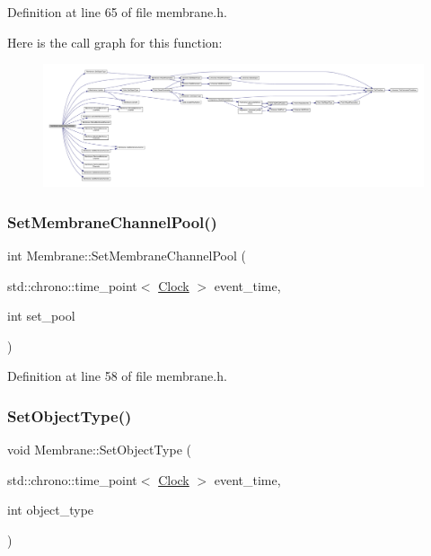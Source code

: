 Definition at line 65 of file membrane.\+h.

Here is the call graph for this function\+:
\nopagebreak
\begin{figure}[H]
\begin{center}
\leavevmode
\includegraphics[width=350pt]{class_membrane_a6d0b96fb6d823cc113dd56b8889b1544_cgraph}
\end{center}
\end{figure}
\mbox{\label{class_membrane_a2cb70232c6aecf1c83a8e0918cb7fabe}} 
\subsubsection{\texorpdfstring{Set\+Membrane\+Channel\+Pool()}{SetMembraneChannelPool()}}
{\footnotesize\ttfamily int Membrane\+::\+Set\+Membrane\+Channel\+Pool (\begin{DoxyParamCaption}\item[{std\+::chrono\+::time\+\_\+point$<$ \hyperlink{universe_8h_a0ef8d951d1ca5ab3cfaf7ab4c7a6fd80}{Clock} $>$}]{event\+\_\+time,  }\item[{int}]{set\+\_\+pool }\end{DoxyParamCaption})\hspace{0.3cm}{\ttfamily [inline]}}



Definition at line 58 of file membrane.\+h.

\mbox{\label{class_membrane_a5ba2bcb906f3984b28f1030207e106ad}} 
\subsubsection{\texorpdfstring{Set\+Object\+Type()}{SetObjectType()}}
{\footnotesize\ttfamily void Membrane\+::\+Set\+Object\+Type (\begin{DoxyParamCaption}\item[{std\+::chrono\+::time\+\_\+point$<$ \hyperlink{universe_8h_a0ef8d951d1ca5ab3cfaf7ab4c7a6fd80}{Clock} $>$}]{event\+\_\+time,  }\item[{int}]{object\+\_\+type }\end{DoxyParamCaption})}



